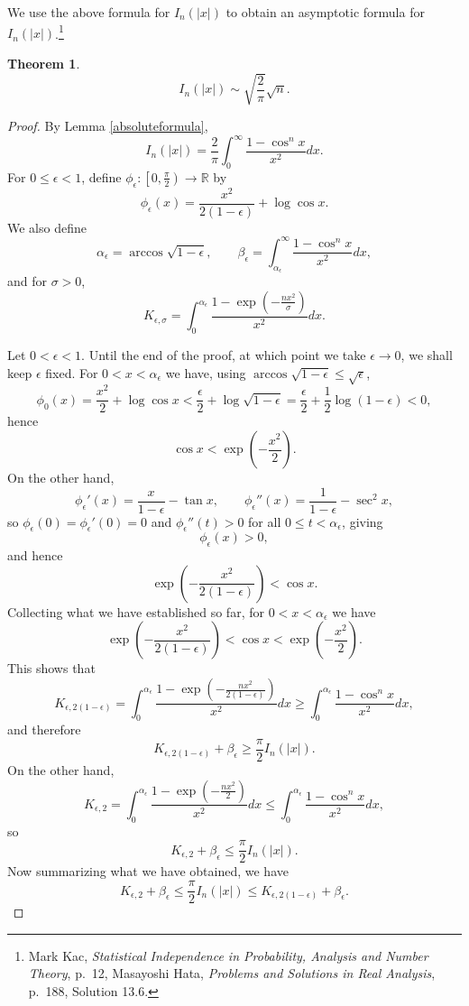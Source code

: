\documentclass{article}
\newtheorem{theorem}{Theorem}
\theoremstyle{definition}
\begin{document}
We use the above formula for $I_n(|x|)$  to obtain an asymptotic formula for $I_n(|x|)$.\footnote{Mark Kac, {\em Statistical Independence in Probability, Analysis and Number Theory}, p.~12, Masayoshi Hata, {\em Problems and Solutions in Real Analysis}, p.~188, Solution 13.6.}

\begin{theorem}
\[
I_n(|x|) \sim \sqrt{\frac{2}{\pi}} \sqrt{n}.
\]
\end{theorem}
\begin{proof}
By Lemma \ref{absoluteformula},
\[
I_n(|x|) = \frac{2}{\pi} \int_0^\infty \frac{1-\cos^n x}{x^2} dx.
\]
For $0 \leq \epsilon <1$, define $\phi_\epsilon:\left[0,\frac{\pi}{2} \right) \to \mathbb{R}$ by
\[
\phi_\epsilon(x) = \frac{x^2}{2(1-\epsilon)}+\log \cos x.
\]
We also define
\[
\alpha_\epsilon = \arccos \sqrt{1-\epsilon}, \qquad \beta_\epsilon = \int_{\alpha_\epsilon}^\infty \frac{1-\cos^n x}{x^2} dx,
\]
and for $\sigma>0$,
\[
K_{\epsilon,\sigma} = \int_0^{\alpha_\epsilon} \frac{1-\exp\left(-\frac{nx^2}{\sigma} \right)}{x^2} dx.
\]

Let $0<\epsilon<1$. Until the end of the proof, at which point we take $\epsilon \to 0$, we shall keep $\epsilon$ fixed.
For $0<x<\alpha_\epsilon$ we have, using $\arccos\sqrt{1-\epsilon} \leq \sqrt{\epsilon}$,
\[
\phi_0(x) = \frac{x^2}{2}+\log \cos x < \frac{\epsilon}{2}+ \log \sqrt{1-\epsilon}
= \frac{\epsilon}{2}+ \frac{1}{2} \log(1-\epsilon)<0,
\]
hence 
\[
\cos x < \exp\left(-\frac{x^2}{2}\right).
\]
On the other hand, 
\[
\phi_\epsilon'(x) = \frac{x}{1-\epsilon}-\tan x, \qquad \phi_\epsilon''(x) = \frac{1}{1-\epsilon}-\sec^2 x,
\]
so $\phi_\epsilon(0)=\phi_\epsilon'(0)=0$ and $\phi_\epsilon''(t)> 0$ for all $0 \leq t<\alpha_\epsilon$,
giving
\[
\phi_\epsilon(x)>0,
\]
and hence
\[
\exp\left(-\frac{x^2}{2(1-\epsilon)}\right)<\cos x.
\]
Collecting what we have established so far, for $0<x<\alpha_\epsilon$ we have
\[
\exp\left(-\frac{x^2}{2(1-\epsilon)}\right)<\cos x < \exp\left(-\frac{x^2}{2}\right).
\]
This shows that
\[
K_{\epsilon,2(1-\epsilon)} = \int_0^{\alpha_\epsilon}  \frac{1-\exp\left(-\frac{nx^2}{2(1-\epsilon)} \right)}{x^2} dx
\geq \int_0^{\alpha_\epsilon} \frac{1-\cos^n x}{x^2} dx,
\]
and therefore
\[
K_{\epsilon,2(1-\epsilon)}  + \beta_\epsilon \geq \frac{\pi}{2} I_n(|x|).
\]
On the other hand,
\[
K_{\epsilon,2} = \int_0^{\alpha_\epsilon} \frac{1-\exp\left(-\frac{nx^2}{2} \right)}{x^2} dx
\leq \int_0^{\alpha_\epsilon} \frac{1-\cos^n x}{x^2} dx,
\]
so
\[
K_{\epsilon,2}  + \beta_\epsilon \leq \frac{\pi}{2} I_n(|x|).
\]
Now summarizing what we have obtained, we have
\begin{equation}
K_{\epsilon,2}  + \beta_\epsilon \leq 
\frac{\pi}{2} I_n(|x|) \leq K_{\epsilon,2(1-\epsilon)}  + \beta_\epsilon.
\label{Kinequality}
\end{equation}


\end{proof}
\end{document}
